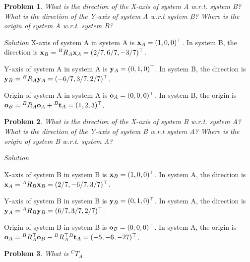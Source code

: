 \documentclass{article}
\newtheorem{prob}{Problem}
\numberwithin{prob}{section}
\newenvironment{solution}{\emph{Solution}}{}
\begin{document}
\begin{prob}
What is the direction of the X-axis of system A w.r.t. system B? What is the direction of the Y-axis of system A w.r.t system B? Where is the origin of system A w.r.t. system B?
\end{prob}
\begin{solution}
X-axis of system A in system A is $\mathbf{x}_A = (1, 0, 0)^\top$. In system B, the direction is $\mathbf{x}_B = {}^B R_A \mathbf{x}_A = (2/7, 6/7, -3/7)^\top$.


Y-axis of system A in system A is $\mathbf{y}_A = (0, 1, 0)^\top$. In system B, the direction is $\mathbf{y}_B = {}^B R_A \mathbf{y}_A = (-6/7, 3/7, 2/7)^\top$.


Origin of system A in system A is $\mathbf{o}_A = (0, 0, 0)^\top$. In system B, the origin is $\mathbf{o}_B = {}^B R_A \mathbf{o}_A + {}^B\mathbf{t}_A = (1, 2, 3)^\top$.

\end{solution}
\begin{prob}
What is the direction of the X-axis of system B w.r.t. system A? What is the direction of the Y-axis of system B w.r.t system A? Where is the origin of system B w.r.t. system A?
\end{prob}
\begin{solution}

X-axis of system B in system B is $\mathbf{x}_B = (1, 0, 0)^\top$. In system A, the direction is $\mathbf{x}_A = {}^A R_B \mathbf{x}_B = (2/7, -6/7, 3/7)^\top$.


Y-axis of system B in system B is $\mathbf{y}_B = (0, 1, 0)^\top$. In system A, the direction is $\mathbf{y}_A = {}^A R_B \mathbf{y}_B = (6/7, 3/7, 2/7)^\top$.


Origin of system B in system B is $\mathbf{o}_B = (0, 0, 0)^\top$. In system A, the origin is $\mathbf{o}_A = {}^B R_A^\top \mathbf{o}_B - {}^B R_A^\top  {}^B\mathbf{t}_A = (-5, -6, -27)^\top$.

\end{solution}
\begin{prob}
  What is ${}^CT_A$
\end{prob}
\end{document}
